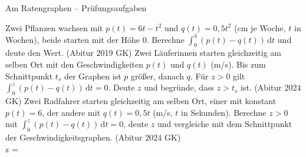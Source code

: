 \begin{aufgabe}{Am Ratengraphen – Prüfungsaufgaben}
\begin{teile}
\teil Zwei Pflanzen wachsen mit $p(t) = 6t - t^2$ und $q(t) = 0{,}5t^2$ (cm je Woche, $t$ in Wochen), beide starten mit der Höhe 0. Berechne $∫_0^4 (p(t) - q(t))\,\mathrm{d}t$ und deute den Wert. \hfill (Abitur 2019 GK)
\teil Zwei Läuferinnen starten gleichzeitig am selben Ort mit den Geschwindigkeiten $p(t)$ und $q(t)$ (m/s). Bis zum Schnittpunkt $t_s$ der Graphen ist $p$ größer, danach $q$. Für $z > 0$ gilt $∫_0^z (p(t) - q(t))\,\mathrm{d}t = 0$. Deute $z$ und begründe, dass $z > t_s$ ist. \hfill (Abitur 2024 GK)
\teil Zwei Radfahrer starten gleichzeitig am selben Ort, einer mit konstant $p(t) = 6$, der andere mit $q(t) = 0{,}5t$ (m/s, $t$ in Sekunden). Berechne $z > 0$ mit $∫_0^z (p(t) - q(t))\,\mathrm{d}t = 0$, deute $z$ und vergleiche mit dem Schnittpunkt der Geschwindigkeitsgraphen. \hfill (Abitur 2024 GK) \\ z = \leerfeld
\end{teile}
\end{aufgabe}

